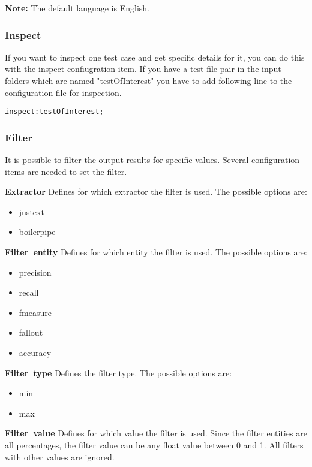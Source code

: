 \textbf{Note:} The default language is English.

\subsubsection{Inspect}
\label{usermanual:inspect}

If you want to inspect one test case and get specific details for it, you can do this with the inspect confiugration item.
If you have a test file pair in the input folders which are named "testOfInterest" you have to add following line to the configuration file for inspection.

\begin{lstlisting}
inspect:testOfInterest;
\end{lstlisting}


\subsubsection{Filter}

It is possible to filter the output results for specific values. Several configuration items are needed to set the filter.

\textbf{Extractor} \linebreak
Defines for which extractor the filter is used. The possible options are:
\begin{itemize}
\item justext
\item boilerpipe
\end{itemize}

\mbox{\textbf{Filter entity}} \linebreak
Defines for which entity the filter is used. The possible options are:
\begin{itemize}
\item precision
\item recall
\item fmeasure
\item fallout
\item accuracy
\end{itemize}

\mbox{\textbf{Filter type}} \linebreak
Defines the filter type. The possible options are:
\begin{itemize}
\item{min}
\item{max}
\end{itemize}

\mbox{\textbf{Filter value}} \linebreak
Defines for which value the filter is used. Since the filter entities are all percentages, the filter value can be any float value between 0 and 1. All filters with other values are ignored.


